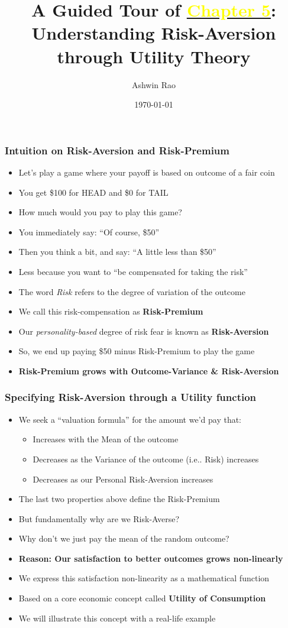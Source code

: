 \documentclass[handout]{beamer}
\title[Utility Theory Chapter]{A Guided Tour of \href{http://stanford.edu/~ashlearn/RLForFinanceBook/book.pdf}{\underline{\textcolor{yellow}{Chapter 5}}}: \\  Understanding Risk-Aversion through Utility Theory}
\author{Ashwin Rao} %
\institute[Stanford] %
{
ICME, Stanford University
}
\date{\today} %
\begin{document}
\begin{frame}
\titlepage %
\end{frame}

\begin{frame}
\frametitle{Intuition on Risk-Aversion and Risk-Premium}
\pause
\begin{itemize}[<+->]
\item Let's play a game where your payoff is based on outcome of a fair coin
\item You get \$100 for HEAD and \$0 for TAIL
\item How much would you pay to play this game?
\item You immediately say: ``Of course, \$50''
\item Then you think a bit, and say: ``A little less than \$50''
\item Less because you want to ``be compensated for taking the risk''
\item The word {\em Risk} refers to the degree of variation of the outcome
\item We call this risk-compensation as {\bf Risk-Premium}
\item Our {\em personality-based} degree of risk fear is known as {\bf Risk-Aversion}
\item So, we end up paying \$50 minus Risk-Premium to play the game
\item {\bf Risk-Premium grows with Outcome-Variance \& Risk-Aversion}
\end{itemize}
\end{frame}

\begin{frame}
\frametitle{Specifying Risk-Aversion through a Utility function}
\pause
\begin{itemize}[<+->]
\item We seek a ``valuation formula'' for the amount we'd pay that:
\begin{itemize}
\item Increases with the Mean of the outcome
\item Decreases as the Variance of the outcome (i.e.. Risk) increases
\item Decreases as our Personal Risk-Aversion increases
\end{itemize}
\item The last two properties above define the Risk-Premium
\item But fundamentally why are we Risk-Averse?
\item Why don't we just pay the mean of the random outcome?
\item {\bf Reason: Our satisfaction to better outcomes grows non-linearly}
\item We express this satisfaction non-linearity as a mathematical function
\item Based on a core economic concept called {\bf Utility of Consumption}
\item We will illustrate this concept with a real-life example
\end{itemize}
\end{frame}
\end{document}
